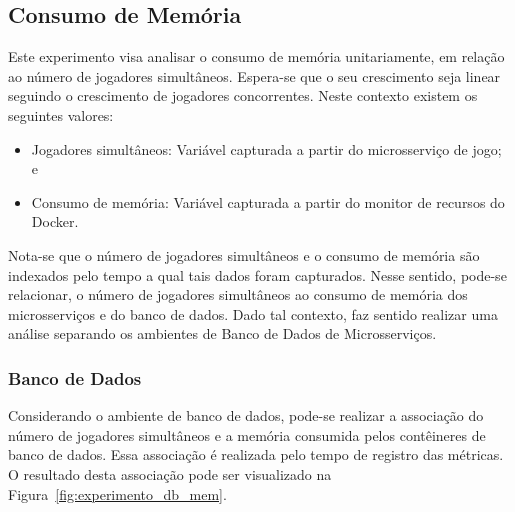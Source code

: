 \subsection{Consumo de Memória}



Este experimento visa analisar o consumo de memória unitariamente, em relação ao número de jogadores simultâneos.
%
Espera-se que o seu crescimento seja linear seguindo o crescimento de jogadores concorrentes.
%
Neste contexto existem os seguintes valores:



\begin{itemize}
    \item Jogadores simultâneos: Variável capturada a partir do microsserviço de jogo; e
    \item Consumo de memória: Variável capturada a partir do monitor de recursos do Docker.
\end{itemize}

Nota-se que o número de jogadores simultâneos e o consumo de memória são indexados pelo tempo a qual tais dados foram capturados.
%
Nesse sentido, pode-se relacionar, o número de jogadores simultâneos ao consumo de memória dos microsserviços e do banco de dados.
%
Dado tal contexto, faz sentido realizar uma análise separando os ambientes de Banco de Dados de Microsserviços.

\subsubsection{Banco de Dados}



Considerando o ambiente de banco de dados, pode-se realizar a associação do número de jogadores simultâneos e a memória consumida pelos contêineres de banco de dados.
%
Essa associação é realizada pelo tempo de registro das métricas.
%
O resultado desta associação pode ser visualizado na Figura~\ref{fig:experimento_db_mem}.



